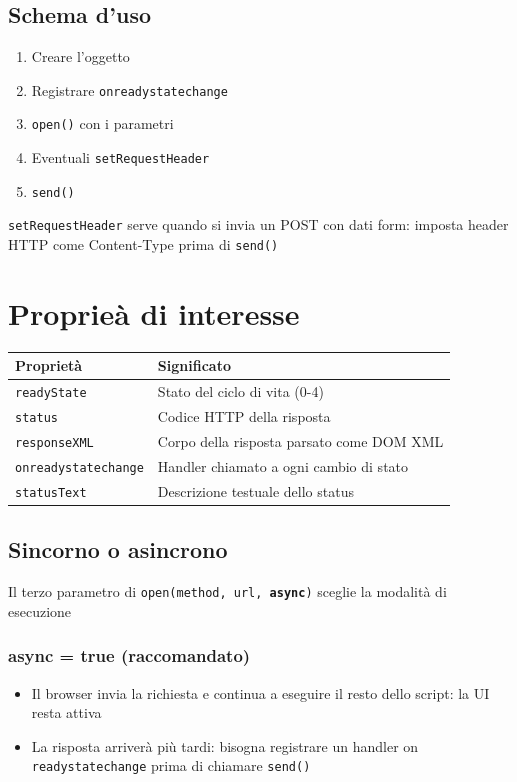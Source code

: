 \subsection{Schema d'uso}
\begin{enumerate}
    \item Creare l'oggetto
    \item Registrare \texttt{onreadystatechange}
    \item \texttt{open()} con i parametri
    \item Eventuali \texttt{setRequestHeader}
    \item \texttt{send()}
\end{enumerate}

\texttt{setRequestHeader} serve quando si invia un POST con dati form: imposta header HTTP come Content-Type prima di \texttt{send()}

\section{Proprieà di interesse}
\begin{tabularx}{\linewidth}{|l|X|}
    \hline
    \textbf{Proprietà} & \textbf{Significato} \\
    \hline
    \texttt{readyState} & Stato del ciclo di vita (0-4) \\
    \hline
    \texttt{status} & Codice HTTP della risposta \\
    \hline
    \texttt{responseXML} & Corpo della risposta parsato come DOM XML \\
    \hline
    \texttt{onreadystatechange} & Handler chiamato a ogni cambio di stato  \\
    \hline
    \texttt{statusText} & Descrizione testuale dello status \\
    \hline
\end{tabularx}
\subsection{Sincorno o asincrono}
Il terzo parametro di \texttt{open(method, url, \textbf{async})} sceglie la modalità di esecuzione

\subsubsection{async = true (raccomandato)}
\begin{itemize}
    \item Il browser invia la richiesta e continua a eseguire il resto dello script: la UI resta attiva
    \item La risposta arriverà più tardi: bisogna registrare un handler on \texttt{readystatechange} prima di chiamare \texttt{send()}
\end{itemize}
